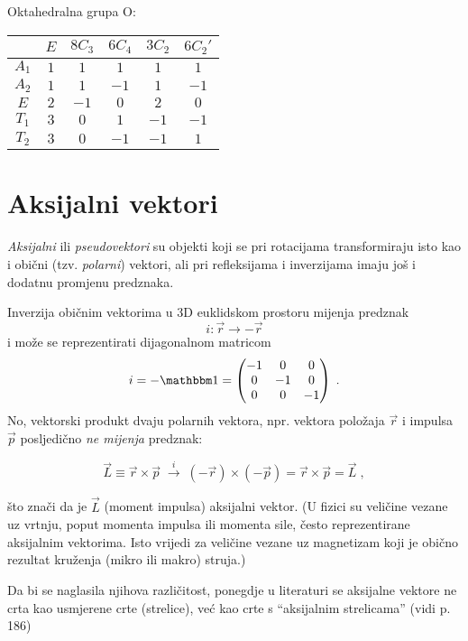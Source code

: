 Oktahedralna grupa O:

\begin{center}
\renewcommand{\arraystretch}{1.2}
\begin{tabular}{c|ccccc}
     & $E$ & $8C_3$ & $6C_4$ & $3C_2$ & $6C_2'$ \\ \hline
    $A_1$ & $1$ & $1$ & $1$ & $1$ & $1$ \\
    $A_2$ & $1$ & $1$ & $-1$ & $1$ & $-1$ \\
    $E$   & $2$ & $-1$ & $0$ & $2$ & $0$ \\
    $T_1$ & $3$ & $0$ & $1$ & $-1$ & $-1$ \\
    $T_2$ & $3$ & $0$ & $-1$ & $-1$ & $1$ \\
\end{tabular}
\end{center}





\chapter{Aksijalni vektori}
\label{sec:aksijalni}

\emph{Aksijalni} ili \emph{pseudovektori} su objekti koji se pri rotacijama transformiraju
isto kao i obični (tzv. \emph{polarni}) vektori, ali pri refleksijama i inverzijama
imaju još i dodatnu promjenu predznaka.

Inverzija običnim vektorima u 3D euklidskom prostoru mijenja
predznak 
$$i: \vec{r} \to - \vec{r}$$ 
i može se reprezentirati dijagonalnom
matricom 
$$
i = -\Eins = 
\begin{pmatrix}
    -1 & 0 & 0 \\
    0 & -1 & 0 \\
    0 & 0 & -1
\end{pmatrix} \;.
$$
No, vektorski produkt dvaju polarnih vektora, npr. vektora položaja $\vec{r}$
i impulsa $\vec{p}$ posljedično \emph{ne mijenja} predznak:

\[  \vec{L}\equiv \vec{r}\times\vec{p} \; \stackrel{i}{\longrightarrow} \;
  (-\vec{r}) \times (-\vec{p}) =  \vec{r}\times\vec{p} = \vec{L}  \;,
\]

što znači da je $\vec{L}$ (moment impulsa) aksijalni vektor. (U fizici su
veličine vezane uz vrtnju, poput momenta impulsa ili momenta sile, 
često reprezentirane aksijalnim vektorima. Isto vrijedi za veličine
vezane uz magnetizam koji je obično rezultat kruženja (mikro ili makro) struja.)

Da bi se naglasila njihova različitost,
ponegdje u literaturi se aksijalne vektore ne crta kao usmjerene crte
(strelice), već kao crte s ``aksijalnim strelicama'' (vidi 
\cite{Bronstejn:2004} p. 186)

